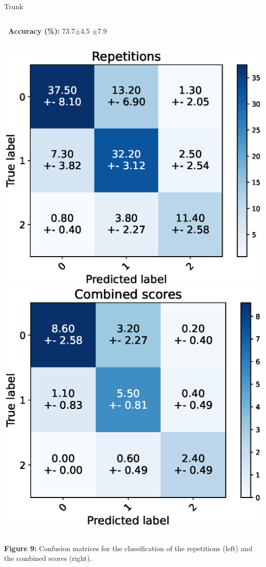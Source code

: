 \begin{frame}[fragile]{Trunk}
  \begin{columns}
    \textbf{\small~Accuracy (\%):} 73.7$\pm$4.5
    \vspace{0.3cm}
    $\pm$7.9
    \vspace{0.3cm}
  \end{columns}
  \begin{columns}
    \centering
    \includegraphics[width=\textwidth]{files/figs/res/trunk/cnf-reps.eps}
    \centering
    \includegraphics[width=\textwidth]{files/figs/res/trunk/cnf-combined.eps}
  \end{columns}
  {\scriptsize\newline\textbf{Figure 9:} Confusion matrices for the classification of the repetitions (left) and the combined scores (right).}
\end{frame}

